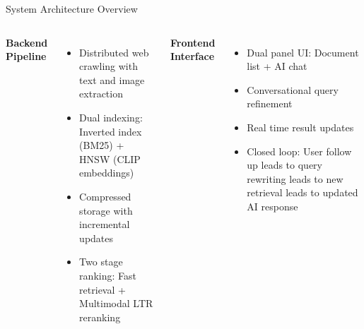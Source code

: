 \begin{frame}{System Architecture Overview}
    \begin{columns}[t]
        \textbf{Backend Pipeline}
        \begin{itemize}
            \item Distributed web crawling with text and image extraction
            \item Dual indexing: Inverted index (BM25) + HNSW (CLIP embeddings)
            \item Compressed storage with incremental updates
            \item Two stage ranking: Fast retrieval + Multimodal LTR reranking
        \end{itemize}
        
        \textbf{Frontend Interface}
        \begin{itemize}
            \item Dual panel UI: Document list + AI chat
            \item Conversational query refinement
            \item Real time result updates
            \item Closed loop: User follow up leads to query rewriting leads to new retrieval leads to updated AI response
        \end{itemize}
    \end{columns}
\end{frame}
